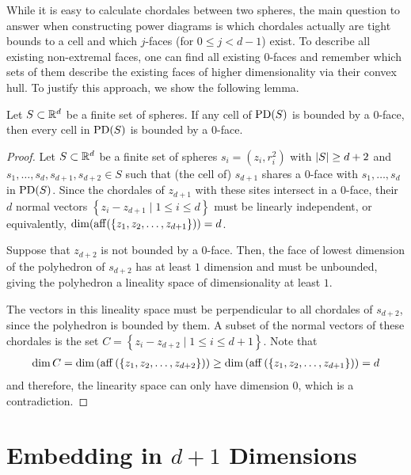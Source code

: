 While it is easy to calculate chordales between two spheres, the main question to answer when constructing power diagrams is which chordales actually are tight bounds to a cell and which $j$-faces (for $0 \leq j < d - 1$) exist.
To describe all existing non-extremal faces, one can find all existing $0$-faces and remember which sets of them describe the existing faces of higher dimensionality via their convex hull.
To justify this approach, we show the following lemma.

\begin{lemma}
    Let $S \subset \mathbb{R}^d$ be a finite set of spheres.
    If any cell of $\operatorname{PD}(S)$ is bounded by a $0$-face, then every cell in $\operatorname{PD}(S)$ is bounded by a $0$-face.
\end{lemma}
\begin{proof}
    Let $S \subset \mathbb{R}^d$ be a finite set of spheres $s_i = (z_i, r_i^2)$ with $\left\vert S \right\vert \geq d+2$ and $s_1, \dots, s_d, s_{d+1}, s_{d+2} \in S$ such that (the cell of) $s_{d+1}$ shares a $0$-face with $s_1, \dots, s_d$ in $\operatorname{PD}(S)$.
    Since the chordales of $z_{d+1}$ with these sites intersect in a $0$-face, their $d$ normal vectors $\left\{  z_i - z_{d+1} \mid 1 \leq i \leq d\right\}$ must be linearly independent, or equivalently, $\dim(\operatorname{aff}(\left\{ z_1, z_2, \dots, z_{d+1} \right\})) = d$.

    Suppose that $z_{d+2}$ is not bounded by a $0$-face.
    Then, the face of lowest dimension of the polyhedron of $s_{d+2}$ has at least $1$ dimension and must be unbounded, giving the polyhedron a lineality space of dimensionality at least $1$.

    The vectors in this lineality space must be perpendicular to all chordales of $s_{d+2}$, since the polyhedron is bounded by them.
    A subset of the normal vectors of these chordales is the set $C = \left\{ z_i - z_{d+2} \mid 1 \leq i \leq d+1 \right\}$.
    Note that
    \begin{align}
        \dim C = \dim \left( \operatorname{aff} \left( \left\{ z_1, z_2, \dots, z_{d+2} \right\} \right) \right) \geq \dim \left( \operatorname{aff} \left( \left\{ z_1, z_2, \dots, z_{d+1} \right\} \right) \right) = d
    \end{align}
    and therefore, the linearity space can only have dimension $0$, which is a contradiction.
\end{proof}

\section{Embedding in $d+1$ Dimensions}
\label{sec:embedding_in_d_1_dimensions}
